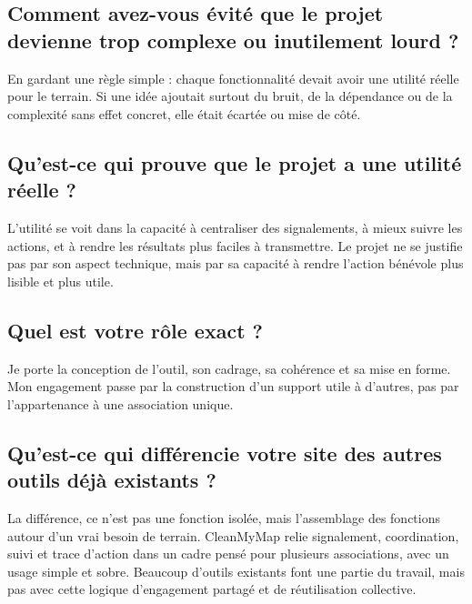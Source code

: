 \documentclass[
  10pt,
  a4paper,
  DIV=11,
  numbers=noendperiod,
  oneside]{scrreprt}
\begin{document}
\subsection{Comment avez-vous évité que le projet devienne trop complexe
ou inutilement lourd
?}\label{comment-avez-vous-uxe9vituxe9-que-le-projet-devienne-trop-complexe-ou-inutilement-lourd}

En gardant une règle simple : chaque fonctionnalité devait avoir une
utilité réelle pour le terrain. Si une idée ajoutait surtout du bruit,
de la dépendance ou de la complexité sans effet concret, elle était
écartée ou mise de côté.

\subsection{Qu'est-ce qui prouve que le projet a une utilité réelle
?}\label{quest-ce-qui-prouve-que-le-projet-a-une-utilituxe9-ruxe9elle}

L'utilité se voit dans la capacité à centraliser des signalements, à
mieux suivre les actions, et à rendre les résultats plus faciles à
transmettre. Le projet ne se justifie pas par son aspect technique, mais
par sa capacité à rendre l'action bénévole plus lisible et plus utile.

\subsection{Quel est votre rôle exact
?}\label{quel-est-votre-ruxf4le-exact}

Je porte la conception de l'outil, son cadrage, sa cohérence et sa mise
en forme. Mon engagement passe par la construction d'un support utile à
d'autres, pas par l'appartenance à une association unique.

\subsection{Qu'est-ce qui différencie votre site des autres outils déjà
existants
?}\label{quest-ce-qui-diffuxe9rencie-votre-site-des-autres-outils-duxe9juxe0-existants}

La différence, ce n'est pas une fonction isolée, mais l'assemblage des
fonctions autour d'un vrai besoin de terrain. CleanMyMap relie
signalement, coordination, suivi et trace d'action dans un cadre pensé
pour plusieurs associations, avec un usage simple et sobre. Beaucoup
d'outils existants font une partie du travail, mais pas avec cette
logique d'engagement partagé et de réutilisation collective.
\end{document}
